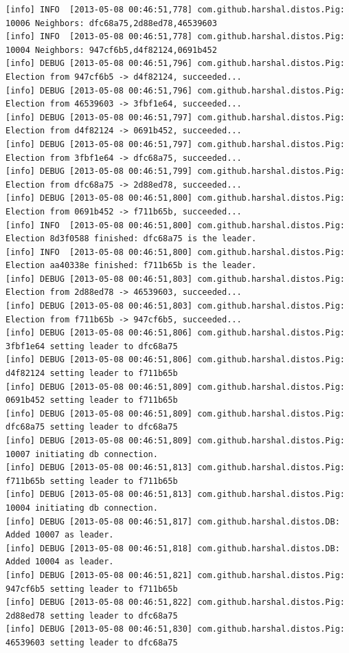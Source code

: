 \documentclass[]{article}
\begin{document}
\begin{verbatim}
[info] INFO  [2013-05-08 00:46:51,778] com.github.harshal.distos.Pig: 10006 Neighbors: dfc68a75,2d88ed78,46539603
[info] INFO  [2013-05-08 00:46:51,778] com.github.harshal.distos.Pig: 10004 Neighbors: 947cf6b5,d4f82124,0691b452
[info] DEBUG [2013-05-08 00:46:51,796] com.github.harshal.distos.Pig: Election from 947cf6b5 -> d4f82124, succeeded...
[info] DEBUG [2013-05-08 00:46:51,796] com.github.harshal.distos.Pig: Election from 46539603 -> 3fbf1e64, succeeded...
[info] DEBUG [2013-05-08 00:46:51,797] com.github.harshal.distos.Pig: Election from d4f82124 -> 0691b452, succeeded...
[info] DEBUG [2013-05-08 00:46:51,797] com.github.harshal.distos.Pig: Election from 3fbf1e64 -> dfc68a75, succeeded...
[info] DEBUG [2013-05-08 00:46:51,799] com.github.harshal.distos.Pig: Election from dfc68a75 -> 2d88ed78, succeeded...
[info] DEBUG [2013-05-08 00:46:51,800] com.github.harshal.distos.Pig: Election from 0691b452 -> f711b65b, succeeded...
[info] INFO  [2013-05-08 00:46:51,800] com.github.harshal.distos.Pig: Election 8d3f0588 finished: dfc68a75 is the leader.
[info] INFO  [2013-05-08 00:46:51,800] com.github.harshal.distos.Pig: Election aa40338e finished: f711b65b is the leader.
[info] DEBUG [2013-05-08 00:46:51,803] com.github.harshal.distos.Pig: Election from 2d88ed78 -> 46539603, succeeded...
[info] DEBUG [2013-05-08 00:46:51,803] com.github.harshal.distos.Pig: Election from f711b65b -> 947cf6b5, succeeded...
[info] DEBUG [2013-05-08 00:46:51,806] com.github.harshal.distos.Pig: 3fbf1e64 setting leader to dfc68a75
[info] DEBUG [2013-05-08 00:46:51,806] com.github.harshal.distos.Pig: d4f82124 setting leader to f711b65b
[info] DEBUG [2013-05-08 00:46:51,809] com.github.harshal.distos.Pig: 0691b452 setting leader to f711b65b
[info] DEBUG [2013-05-08 00:46:51,809] com.github.harshal.distos.Pig: dfc68a75 setting leader to dfc68a75
[info] DEBUG [2013-05-08 00:46:51,809] com.github.harshal.distos.Pig: 10007 initiating db connection.
[info] DEBUG [2013-05-08 00:46:51,813] com.github.harshal.distos.Pig: f711b65b setting leader to f711b65b
[info] DEBUG [2013-05-08 00:46:51,813] com.github.harshal.distos.Pig: 10004 initiating db connection.
[info] DEBUG [2013-05-08 00:46:51,817] com.github.harshal.distos.DB: Added 10007 as leader.
[info] DEBUG [2013-05-08 00:46:51,818] com.github.harshal.distos.DB: Added 10004 as leader.
[info] DEBUG [2013-05-08 00:46:51,821] com.github.harshal.distos.Pig: 947cf6b5 setting leader to f711b65b
[info] DEBUG [2013-05-08 00:46:51,822] com.github.harshal.distos.Pig: 2d88ed78 setting leader to dfc68a75
[info] DEBUG [2013-05-08 00:46:51,830] com.github.harshal.distos.Pig: 46539603 setting leader to dfc68a75

\end{verbatim}
\end{document}
